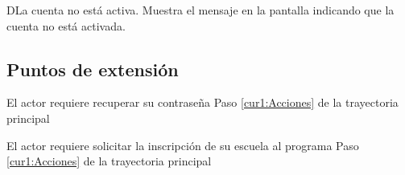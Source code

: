  \begin{UCtrayectoriaA}{D}{La cuenta no está activa.}
    \UCpaso[\UCsist] Muestra el mensaje  en la pantalla  indicando que la cuenta no está activada.
 \end{UCtrayectoriaA} 
 
\subsection{Puntos de extensión}

\UCExtensionPoint
{El actor requiere recuperar su contraseña}
{ Paso \ref{cur1:Acciones} de la trayectoria principal}
{}

\UCExtensionPoint
{El actor requiere solicitar la inscripción de su escuela al programa}
{ Paso \ref{cur1:Acciones} de la trayectoria principal}
{}
 

